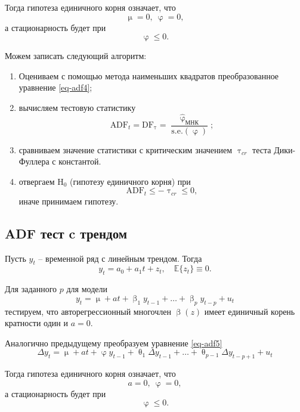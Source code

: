 \documentclass[a4paper, 14pt]{extreport}
\numberwithin{equation}{subsection}
\renewcommand{\leq}{\leqslant}
\renewcommand{\beta}{\upbeta}
\renewcommand{\varphi}{\upvarphi}
\renewcommand{\tau}{\uptau}
\renewcommand{\theta}{\uptheta}
\renewcommand{\mu}{\upmu}
\newcommand{\E}{\mathbb E}
\numberwithin{equation}{section}
\begin{document}
	Тогда гипотеза единичного корня означает, что $$\mu=0,\ \varphi=0,$$ а стационарность будет при $$\varphi\leq 0.$$
	
	Можем записать следующий алгоритм:
	\begin{enumerate}
		\renewcommand{\labelenumi}{(\alph{enumi})}
		\item Оцениваем с помощью метода наименьших квадратов преобразованное уравнение \eqref{eq-adf4};
		\item вычисляем тестовую статистику
		\begin{equation}
			\text{ADF}_t=\text{DF}_\tau=\dfrac{\widehat{\varphi}_{\text{МНК}}}{\text{s.e.}(\varphi)};
		\end{equation}
		\item сравниваем значение статистики с критическим значением $\tau_{cr}$ теста Дики-Фуллера с константой.
		\item отвергаем $\text{H}_0$ (гипотезу единичного корня) при
		\begin{equation}\text{ADF}_t\leq -\tau_{cr}\leq 0,\end{equation}
		иначе принимаем гипотезу.
	\end{enumerate}
	\subsection{ADF тест c трендом}
	
	Пусть $y_t$ -- временной ряд с линейным трендом. Тогда
	\begin{equation}
		y_t=a_0+a_1t+z_t,\quad \E \{z_t\}\equiv0.
	\end{equation}
	
	Для заданного $p$ для модели
	\begin{equation}
		y_t=\mu+a t+\beta_1y_{t-1}+\dots+\beta_py_{t-p}+u_t
		\label{eq-adf5}
	\end{equation}
	тестируем, что авторегрессионный многочлен $\beta(z)$ имеет единичный корень кратности один и $a=0$.
	
	Аналогично предыдущему преобразуем уравнение \eqref{eq-adf5}
	\begin{equation}
		\Delta y_t=\mu+a t+\varphi y_{t-1}+\theta_1\Delta y_{t-1}+\dots+\theta_{p-1}\Delta y_{t-p+1}+u_t
		\label{eq-adf6}
	\end{equation}
	
	Тогда гипотеза единичного корня означает, что $$a=0,\ \varphi=0,$$ а стационарность будет при $$\varphi\leq 0.$$
	
\end{document}
